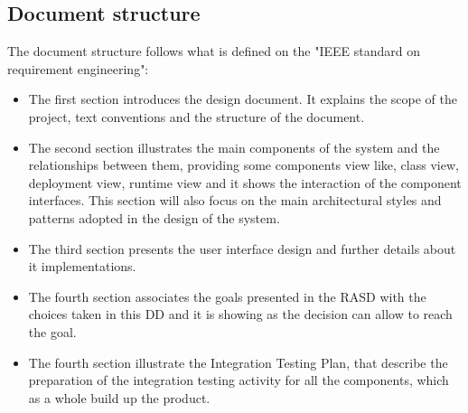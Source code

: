 \subsection{Document structure}
The document structure follows what is defined on the "IEEE standard on requirement engineering":
\begin{itemize}
\item The first section introduces the design document. It explains the scope of the project, text conventions and the structure of the document.
\item The second section illustrates the main components of the system and the relationships between them, providing some components view like, class view, deployment view, runtime view and it shows the interaction of the component interfaces.  This section will also focus on the main architectural styles and patterns adopted in the design of the system.
\item The third section presents the user interface design and further details about it implementations.
\item The fourth section associates the goals presented in the RASD with the choices taken in this DD and it is showing as the decision can allow to reach the goal.
\item The fourth section illustrate the Integration Testing Plan, that describe the preparation of the integration testing activity for all the components, which as a whole build up the product.
\end{itemize}